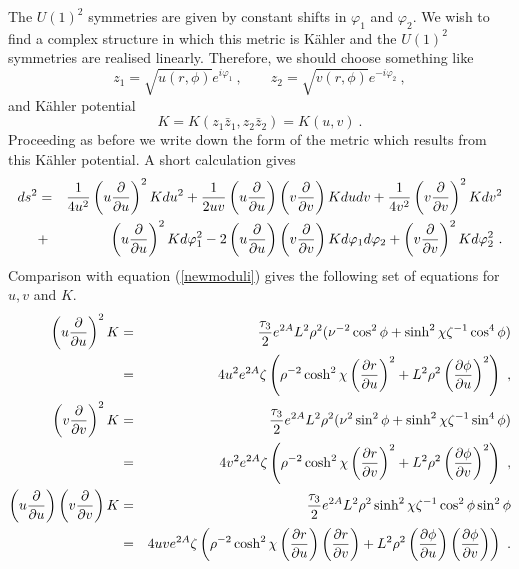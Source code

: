 \documentclass[a4paper,12pt]{article}
\newcommand{\reef}[1]{(\ref{#1})}
\begin{document}
The $U(1)^2$ symmetries are given by constant shifts in $\varphi_1$
and $\varphi_2$. We wish to find a complex structure in which this
metric is K\"ahler and the $U(1)^2$ symmetries are realised linearly.
Therefore, we should choose something like
\begin{equation}
z_{1} = \sqrt{u(r,\phi)} e^{i\varphi_1}\ ,
\qquad z_{2} = \sqrt{v(r,\phi)} e^{-i\varphi_2}\ ,
\end{equation}
and K\"ahler potential 
\begin{equation}
K = K(z_1 {\bar z}_1 , z_2 {\bar z}_2)  = K(u,v)  \ .
\end{equation}
Proceeding as before we write down the form of the metric which
results from this K\"ahler potential. A short calculation gives
\begin{eqnarray}
ds^2 &=& {1 \over 4u^2}\left(u {\partial \over \partial u}\right)^2 K du^2 
+ {1 \over 2uv}\left( u {\partial \over \partial u}\right)
\left(v {\partial \over \partial v}\right) K  du dv 
+ {1 \over 4v^2}\left(v {\partial \over \partial v}\right)^2 K dv^2 \nonumber\\
&+& \left(u {\partial \over \partial u}\right)^2 K d\varphi_1^2 
-2 \left(u {\partial \over \partial u}\right)
\left(v {\partial \over \partial v}\right) K d\varphi_1 d\varphi_2 
+ \left(v {\partial \over \partial v}\right)^2 K d\varphi_2^2\ .
\end{eqnarray} 
Comparison with equation \reef{newmoduli} gives the following set of
equations for $u,v$ and $K$.
\begin{eqnarray}
\left(u {\partial \over \partial u}\right)^2 K &=& {\tau_3 \over 2} e^{2A} L^2 \rho^2 (\nu^{-2} \cos^2 \phi  + \sinh^2 \chi  \zeta^{-1} \cos^4 \phi ) \nonumber\\
&=& 4u^2 e^{2A} \zeta \left(\rho^{-2} \cosh^2 \chi  \left({\partial r \over \partial u}\right)^2 + L^2 \rho^2  \left({\partial \phi \over \partial u}\right)^2 \right)\ , \nonumber\\
\left(v {\partial \over \partial v}\right)^2 K &=& {\tau_3 \over 2} e^{2A} L^2 \rho^2 (\nu^{2} \sin^2 \phi  + \sinh^2 \chi  \zeta^{-1} \sin^4 \phi ) \nonumber\\
&=& 4v^2 e^{2A} \zeta \left(\rho^{-2} \cosh^2 \chi  \left({\partial r \over \partial v}\right)^2 + L^2 \rho^2  \left({\partial \phi \over \partial v}\right)^2 \right)\ , \nonumber\\
\left(u {\partial \over \partial u}\right)\left(v {\partial \over \partial v}\right) K &=& {\tau_3 \over 2} e^{2A} L^2 \rho^2  \sinh^2 \chi  \zeta^{-1} \cos^2 \phi  \sin^2 \phi \nonumber\\
&=& 4uv e^{2A} \zeta \left(\rho^{-2} \cosh^2 \chi  \left({\partial r \over \partial u}\right) \left({\partial r \over \partial v}\right) + L^2 \rho^2  \left({\partial \phi \over \partial u}\right) \left({\partial \phi \over \partial v}\right)\right)\ .
\end{eqnarray}
\end{document}
